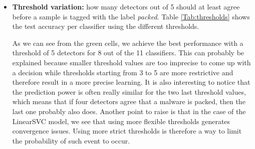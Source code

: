 \begin{itemize}
    \item \textbf{Threshold variation:} how many detectors out of 5 should at least agree before a sample is tagged with the label \textit{packed}. Table \ref{Tab:thresholds} shows the test accuracy per classifier using the different thresholds.
    \begin{table}
    \centering
    \caption{Threshold variation}
    \label{Tab:thresholds}
    \end{table}
    As we can see from the green cells, we achieve the best performance with a threshold of 5 detectors for 8 out of the 11 classifiers. This can probably be explained because smaller threshold values are too imprecise to come up with a decision while thresholds starting from 3 to 5 are more restrictive and therefore result in a more precise learning. It is also interesting to notice that the prediction power is often really similar for the two last threshold values, which means that if four detectors agree that a malware is packed, then the last one probably also does. Another point to raise is that in the case of the LinearSVC model, we see that using more flexible thresholds generates convergence issues. Using more strict thresholds is therefore a way to limit the probability of such event to occur.

\end{itemize}
